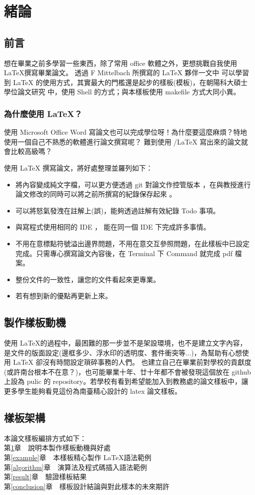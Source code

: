 \chapter{緒論}\label{explanation}


\section{前言}\label{1-1}
想在畢業之前多學習一些東西，除了常用 office 軟體之外，更想挑戰自我使用 \LaTeX 撰寫畢業論文。
透過 F Mittelbach 所撰寫的 LaTeX 夥伴一文中 \cite{mittelbach2004} 可以學習到 LaTeX\cite{the-latex-project} 的使用方式，其實最大的門檻還是起步的樣板(模板)，在朝陽科大碩士學位論文研究 \cite{ShellLATEX} 中，使用 Shell 的方式；與本樣板使用 makefile 方式大同小異。

\subsection{為什麼使用 LaTeX？}
使用 Microsoft Office Word 寫論文也可以完成學位呀！為什麼要這麼麻煩？特地使用一個自己不熟悉的軟體進行論文撰寫呢？
難到使用 /LaTeX 寫出來的論文就會比較高級嗎？

使用 LaTeX 撰寫論文，將好處整理並羅列如下：\\
\begin{itemize}
\item 將內容變成純文字檔，可以更方便透過 git \cite{git-version-control}對論文作控管版本 \cite{spinellis2012git}，在與教授進行論文修改的同時可以將之前所撰寫的紀錄保存起來 \cite{chacon2014pro}。
\item 可以將怒氣發洩在註解上(誤)，能夠透過註解有效紀錄 Todo 事項。
\item 與寫程式使用相同的 IDE ， 能在同一個 IDE 下完成許多事情。
\item 不用在意標點符號溢出邊界問題，不用在意交互參照問題，在此樣板中已設定完成。只需專心撰寫論文內容後，在 Terminal 下 Command 就完成 pdf 檔案。
\item 整份文件的一致性，讓您的文件看起來更專業。
\item 若有想到新的優點再更新上來。
\end{itemize}

\newpage

\section{製作樣板動機}\label{1-2}
使用 \LaTeX 的過程中，最困難的那一步並不是架設環境，也不是建立文字內容，是文件的版面設定(邊框多少、浮水印的透明度、套件衝突等...)，為幫助有心想使用 LaTeX 卻沒有時間設定瑣碎事務的人們。
也建立自己在畢業前對學校的貢獻度(或許南台根本不在意？)，也可能畢業十年、廿十年都不會被發現這個放在 github 上設為 pulic 的 repository。若學校有看到希望能加入到教務處的論文樣板中，讓更多學生能夠看見這份為南臺精心設計的 latex 論文樣板。

\newpage

\section{樣板架構}\label{1-3}
\n 本論文樣板編排方式如下：\\
第\ref{explanation}章　說明本製作樣板動機與好處\\
第\ref{example}章　本樣板精心製作 \LaTeX 語法範例\\
第\ref{algorithm}章　演算法及程式碼插入語法範例\\
第\ref{result}章　驗證樣板結果\\
第\ref{conclusion}章　樣板設計結論與對此樣本的未來期許
